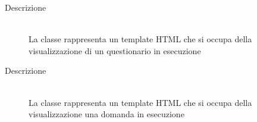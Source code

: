 \vspace{0.5cm}
\hypertarget{client::view::student::ExecuteQuestionnaire}{}
\begin{description}
\item[Descrizione] \hfill \\
La classe rappresenta un template HTML che si occupa della visualizzazione di un questionario in esecuzione
\end{description}

\vspace{0.5cm}
\hypertarget{client::view::student::ExecuteQuestion}{}
\begin{description}
\item[Descrizione] \hfill \\
La classe rappresenta un template HTML che si occupa della visualizzazione una domanda in esecuzione
\end{description}

\vspace{0.5cm}
